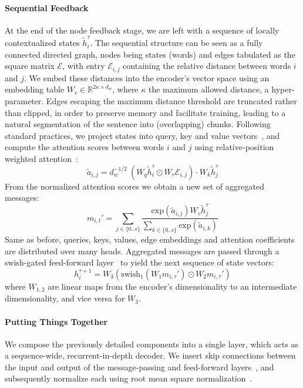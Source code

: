 \paragraph{Sequential Feedback}
At the end of the node feedback stage, we are left with a sequence of locally contextualized states $\tilde{h}^\tau_i$.
The sequential structure can be seen as a fully connected directed graph, nodes being states (words) and edges tabulated as the square matrix $\mathcal{E}$, with entry $\mathcal{E}_{i, j}$ containing the relative distance between words $i$ and $j$.
We embed these distances into the encoder's vector space using an embedding table $W_r \in \mathbb{R}^{2\kappa \times d_w}$, where $\kappa$ the maximum allowed distance, a hyper-parameter.
Edges escaping the maximum distance threshold are truncated rather than clipped, in order to preserve memory and facilitate training, leading to a natural segmentation of the sentence into (overlapping) chunks.
Following standard practices, we project states into query, key and value vectors~\cite{vaswani2017attention}, and compute the attention scores between words $i$ and $j$ using relative-position weighted attention~\cite{shaw-etal-2018-self}:
\begin{equation}
\tilde{a}_{i,j} = d_w^{-1/2}~(W_q \tilde{h}^\tau_i \odot W_r\mathcal{E}_{i,j}) \cdot W_k\tilde{h}^\tau_j
\end{equation}
From the normalized attention scores we obtain a new set of aggregated messages:
\begin{equation}
m_{i,t}' = \sum_{j \in \{0..s\}} \frac{\mathrm{exp}(\tilde{a}_{i,j}) W_v\tilde{h}^\tau_j}{
\sum_{k\in \{0..s\}}
\mathrm{exp}(\tilde{a}_{i,k})}
\end{equation}
Same as before, queries, keys, values, edge embeddings and attention coefficients are distributed over many heads. 
Aggregated messages are passed through a swish-gated feed-forward layer~\cite{dauphin2017language,shazeer2020glu} to yield the next sequence of state vectors:
\begin{equation}
h^{\tau+1}_i = W_3\left(\mathrm{swish}_1(W_1 m_{i,\tau}')\odot W_2m_{i,\tau}'\right)
\end{equation}
where $W_{1,2}$ are linear maps from the encoder's dimensionality to an intermediate dimensionality, and vice versa for $W_3$.

\paragraph{Putting Things Together}
We compose the previously detailed components into a single layer, which acts as a sequence-wide, recurrent-in-depth decoder.
We insert skip connections between the input and output of the message-passing and feed-forward layers~\cite{he2016deep}, and subsequently normalize each using root mean square normalization~\cite{zhang2019root}.


